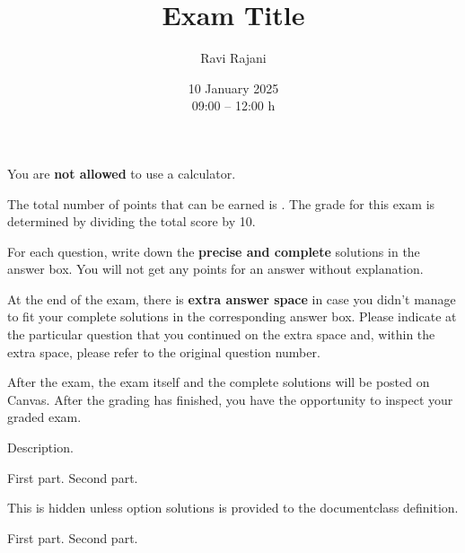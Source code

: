 \totalpts[100]
\title{Exam Title}
\author{Ravi Rajani}
\date{10 January 2025\\ 09:00 -- 12:00 h}

\maketitle
\begin{instructions}
    \item You are \textbf{not allowed} to use a calculator.

    \item The total number of points that can be earned is \totalpts. The grade for this exam is determined by dividing the total score by 10.

    \item For each question, write down the \textbf{precise and complete} solutions in the answer box. You will not get any points for an answer without explanation.

    \item At the end of the exam, there is \textbf{extra answer space} in case you didn't manage to fit your complete solutions in the corresponding answer box. Please indicate at the particular question that you continued on the extra space and, within the extra space, please refer to the original question number.

    \item After the exam, the exam itself and the complete solutions will be posted on Canvas. After the grading has finished, you have the opportunity to inspect your graded exam.
\end{instructions}
\begin{question}[8]
    Description.
    \begin{subparts}
        \subpart[4] First part.
        \subpart[1] Second part.
    \end{subparts}
\end{question}
\begin{soltn}
    This is hidden unless option \textsf{solutions} is provided to the \textsf{documentclass} definition.
\end{soltn}
\begin{question}[10]
    \nodescription
    \begin{subparts}
        \subpart[5] First part.
        \subpart[5] Second part.
    \end{subparts}
\end{question}

